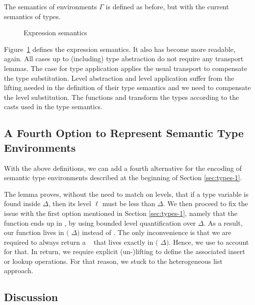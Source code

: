 \documentclass[manuscript,screen,review,anonymous]{acmart}
\begin{document}
The semantics of environments $\Gamma$ is defined as before, but with
the current semantics of types.
\begin{figure}
  \EHESem
  \caption{Expression semantics}
  \label{fig:eh-expression-semantics}
\end{figure}

Figure~\ref{fig:eh-expression-semantics} defines the expression
semantics. It also has become more readable, again. All cases up to
(including) type abstraction do not require any transport lemmas. The
case for type application applies the usual transport to compensate
the type substitution. Level abstraction and level application suffer
from the lifting needed in the definition of their type semantics and
we need to compensate the level substitution. The functions
 and  transform the
types according to the casts used in the type semantics.

\subsection{A Fourth Option to Represent Semantic Type Environments}
\label{sec:fourth-opti-repr}

With the above definitions, we can add a fourth alternative for the encoding of semantic type environments described at the beginning of Section \ref{sec:types-1}.

\SFVarLess
\SFFEnv

The lemma  proves, without the need to match on levels, that
if a type variable is found inside $\Delta$, then its level $\ell$ must be less than
 $\Delta$.
We then proceed to fix the issue with the first option mentioned in Section \ref{sec:types-1},
namely that the function ends up in ,
by using bounded level quantification over  $\Delta$.
As a result, our function lives in $($ $\Delta)$
instead of .
The only inconvenience is that we are required to always return a \ASet~
that lives exactly in $($ $\Delta)$.
Hence, we use  to account for that.
In return, we require explicit (un-)lifting to define the associated insert or lookup operations.
For that reason, we stuck to the heterogeneous list approach.


\subsection{Discussion}
\label{sec:discussion-2}
\end{document}
